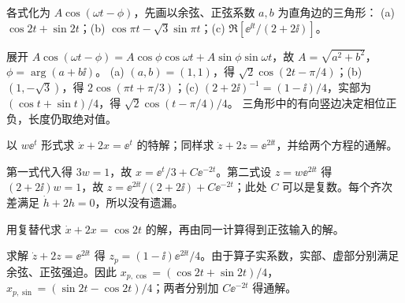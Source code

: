\begin{exercise}\label{cw:rec05-3}
各式化为 $A\cos(\omega t-\phi)$，先画以余弦、正弦系数 $a,b$ 为直角边的三角形：
(a) $\cos2t+\sin2t$；(b) $\cos\pi t-\sqrt3\sin\pi t$；(c) $\Re[\ee^{\ii t}/(2+2\ii)]$。
\end{exercise}
\begin{solution}
展开 $A\cos(\omega t-\phi)=A\cos\phi\cos\omega t+A\sin\phi\sin\omega t$，故 $A=\sqrt{a^2+b^2}$，$\phi=\arg(a+b\ii)$。
(a) $(a,b)=(1,1)$，得 $\sqrt2\cos(2t-\pi/4)$；(b) $(1,-\sqrt3)$，得 $2\cos(\pi t+\pi/3)$；(c) $(2+2\ii)^{-1}=(1-\ii)/4$，实部为 $(\cos t+\sin t)/4$，得 $\sqrt2\cos(t-\pi/4)/4$。
三角形中的有向竖边决定相位正负，长度仍取绝对值。\begin{center}\end{center}
\par{}
\end{solution}

\begin{exercise}\label{cw:rec05-4}
以 $w\ee^t$ 形式求 $\dot x+2x=\ee^t$ 的特解；同样求 $\dot z+2z=\ee^{2\ii t}$，并给两个方程的通解。
\end{exercise}
\begin{solution}
第一式代入得 $3w=1$，故 $x=\ee^t/3+C\ee^{-2t}$。第二式设 $z=w\ee^{2\ii t}$ 得 $(2+2\ii)w=1$，故 $z=\ee^{2\ii t}/(2+2\ii)+C\ee^{-2t}$；此处 $C$ 可以是复数。每个齐次差满足 $\dot h+2h=0$，所以没有遗漏。
\par{}
\end{solution}

\begin{exercise}\label{cw:rec05-5}
用复替代求 $\dot x+2x=\cos2t$ 的解，再由同一计算得到正弦输入的解。
\end{exercise}
\begin{solution}
求解 $\dot z+2z=\ee^{2\ii t}$ 得 $z_p=(1-\ii)\ee^{2\ii t}/4$。由于算子实系数，实部、虚部分别满足余弦、正弦强迫。因此 $x_{p,\cos}=(\cos2t+\sin2t)/4$，$x_{p,\sin}=(\sin2t-\cos2t)/4$；两者分别加 $C\ee^{-2t}$ 得通解。
\par{}
\end{solution}

